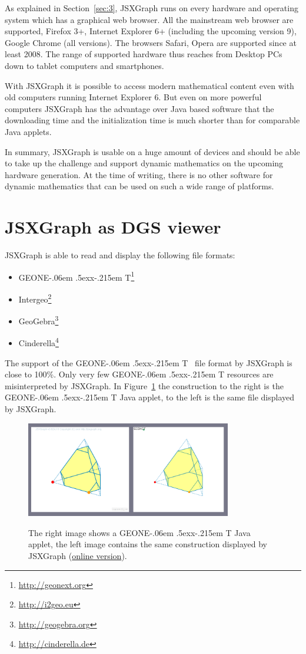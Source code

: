 \documentclass[12pt,a4paper]{article}%
\def\GEONExT{GEONE\kern-.06em \lower.5ex\hbox{x}\kern-.215em T}
\begin{document}
As explained in Section~\ref{sec:3}, JSXGraph runs on every hardware and operating system which has a graphical 
web browser. 
All the mainstream web browser are supported, Firefox 3+, Internet Explorer
6+ (including the upcoming version 9), Google Chrome (all versions). 
The browsers Safari, Opera are supported since at least 2008. 
The range of supported hardware thus reaches from Desktop PCs 
down to tablet computers and smartphones. 

With JSXGraph it is possible to access modern mathematical content even with old computers
running Internet Explorer 6.
But even on more powerful computers JSXGraph has the advantage over Java based software 
that the downloading time and the initialization time is much shorter than for comparable Java applets. 

In summary, JSXGraph is usable on a huge amount of devices and should be able to take up the challenge and support dynamic mathematics on the upcoming hardware generation.
At the time of writing, there is no other software for dynamic mathematics that can be used on such a wide range of 
platforms.


\section{JSXGraph as DGS viewer}
JSXGraph is able to read and display the following file formats:
\begin{itemize} 
\item \GEONExT{}\footnote{\href{http://geonext.org}{http://geonext.org}}
\item Intergeo\footnote{\href{http://i2geo.eu}{http://i2geo.eu}}
\item GeoGebra\footnote{\href{geogebra.org}{http://geogebra.org}}
\item Cinderella\footnote{\href{http://cinderella.de}{http://cinderella.de}}
\end{itemize}
The support of the \GEONExT{}~\cite{ehmann2003,ehmann2008} file format by JSXGraph is close to 100\%. 
Only very few \GEONExT{} resources are misinterpreted by JSXGraph. 
In Figure~\ref{fig:geonext} the construction to the right is the \GEONExT{} Java applet, to the left is the same file displayed by JSXGraph.
\begin{figure}[ht]
\begin{center}
\includegraphics[width=0.8\textwidth]{geonext.png}\\
\caption{The right image shows a \GEONExT{} Java applet, 
the left image contains the same construction displayed 
by JSXGraph
(\href{http://jsxgraph.uni-bayreuth.de/talks/cadgme10/talk/jsx_gxt.html}{online version}).}\label{fig:geonext}
\end{center}
\end{figure}
\end{document}
